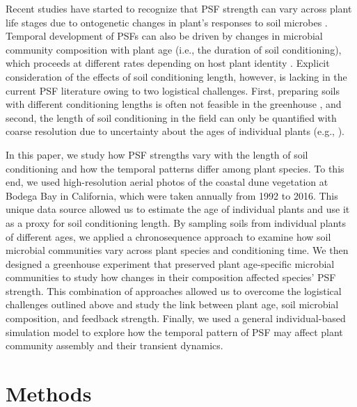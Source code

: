 Recent studies have started to recognize that PSF strength can vary across plant life stages due to ontogenetic changes in plant's responses to soil microbes \citep{Hawkes2012, Dudenhoffer2017, Bezemer2018}. 
Temporal development of PSFs can also be driven by changes in microbial community composition with plant age (i.e., the duration of soil conditioning), which proceeds at different rates depending on host plant identity \citep{Knelman2012}. 
Explicit consideration of the effects of soil conditioning length, however, is lacking in the current PSF literature owing to two logistical challenges. First, preparing soils with different conditioning lengths is often not feasible in the greenhouse \citep{Kardol2013, Kulmatiski2018}, and second, the length of soil conditioning in the field can only be quantified with coarse resolution due to uncertainty about the ages of individual plants (e.g., \citealp{Speek2015, Day2015}).
\par


In this paper, we study how PSF strengths vary with the length of soil conditioning and how the temporal patterns differ among plant species. 
To this end, we used high-resolution aerial photos of the coastal dune vegetation at Bodega Bay in California, which were taken annually from 1992 to 2016. This unique data source allowed us to estimate the age of individual plants and use it as a proxy for soil conditioning length. 
By sampling soils from individual plants of different ages, we applied a chronosequence approach to examine how soil microbial communities vary across plant species and conditioning time. We then designed a greenhouse experiment that preserved plant age-specific microbial communities to study how changes in their composition affected species' PSF strength.
This combination of approaches allowed us to overcome the logistical challenges outlined above and study the link between plant age, soil microbial composition, and feedback strength. 
Finally, we used a general individual-based simulation model to explore how the temporal pattern of PSF may affect plant community assembly and their transient dynamics.
\par



\section{Methods}
